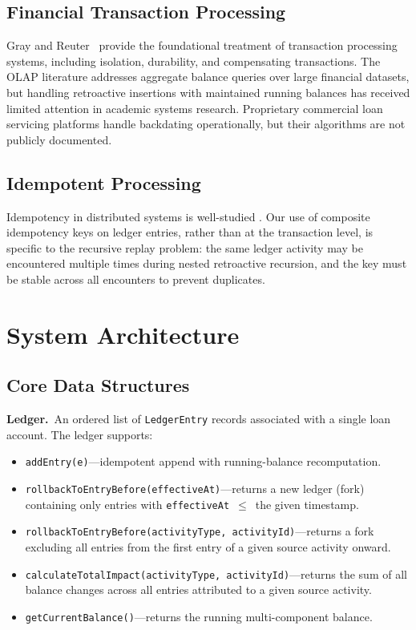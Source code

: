 \documentclass[11pt,letterpaper]{article}
\begin{document}
\subsection{Financial Transaction Processing}
\label{sec:related-financial}

Gray and Reuter~\cite{grayreuter1992} provide the foundational
treatment of transaction processing systems, including isolation,
durability, and compensating transactions. The OLAP literature
addresses aggregate balance queries over large financial datasets, but
handling retroactive insertions with maintained running balances has
received limited attention in academic systems research. Proprietary
commercial loan servicing platforms handle backdating operationally, but
their algorithms are not publicly documented.

\subsection{Idempotent Processing}

Idempotency in distributed systems is well-studied
\cite{bernsteingoodman1981}. Our use of composite idempotency keys on
ledger entries, rather than at the transaction level, is specific to the
recursive replay problem: the same ledger activity may be encountered
multiple times during nested retroactive recursion, and the key must be
stable across all encounters to prevent duplicates.

\section{System Architecture}
\label{sec:architecture}

\subsection{Core Data Structures}

\textbf{Ledger.}~An ordered list of \texttt{LedgerEntry} records
associated with a single loan account. The ledger supports:
\begin{itemize}
  \item \texttt{addEntry(e)}---idempotent append with running-balance
        recomputation.
  \item \texttt{rollbackToEntryBefore(effectiveAt)}---returns a new
        ledger (fork) containing only entries with
        \texttt{effectiveAt}~$\leq$~the given timestamp.
  \item \texttt{rollbackToEntryBefore(activityType, activityId)}---returns
        a fork excluding all entries from the first entry of a given
        source activity onward.
  \item \texttt{calculateTotalImpact(activityType, activityId)}---returns
        the sum of all balance changes across all entries attributed to
        a given source activity.
  \item \texttt{getCurrentBalance()}---returns the running
        multi-component balance.
\end{itemize}
\end{document}

